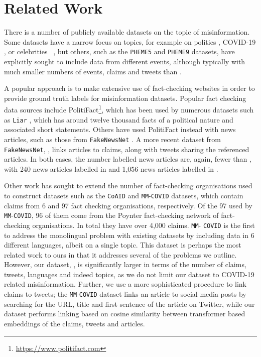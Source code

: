 \documentclass[sigconf,natbib=true,anonymous=false,nonacm]{acmart}
\begin{document}
\section{Related Work}
\label{sec:relatedwork}
There is a number of publicly available datasets on the topic of
misinformation. Some datasets have a narrow focus on topics, for example on
politics \citep{wang2017liar}, COVID-19 \citep{li2020mmcovid, cui2020coaid}, or
celebrities ~\citep{perez2018automatic}, but others, such as the
\texttt{PHEME5} \citep{zubiaga2017exploiting} and \texttt{PHEME9}
\citep{kochkina2018allinone} datasets, have explicitly sought to include data
from different events, although typically with much smaller numbers of events,
claims and tweets than \datasetname.



A popular approach is to make extensive use of fact-checking websites in order
to provide ground truth labels for misinformation datasets. Popular fact
checking data sources include
PolitiFact\footnote{\url{https://www.politifact.com}}, which has been used by
numerous datasets such as \texttt{Liar} \citep{wang2017liar}, which has around
twelve thousand facts of a political nature and associated short statements.
Others have used PolitiFact instead with news articles, such as those from
\texttt{FakeNewsNet} \citep{shu2017exploiting, shu2020fakenewsnet}. A more
recent dataset from \texttt{FakeNewsNet}, \citep{shu2020fakenewsnet}, links
articles to claims, along with tweets sharing the referenced articles. In both
cases, the number labelled news articles are, again, fewer than \datasetname,
with 240 news articles labelled in \citep{shu2017exploiting} and 1,056 news
articles labelled in \citep{shu2020fakenewsnet}.

Other work has sought to extend the number of fact-checking organisations used
to construct datasets such as the \texttt{CoAID} \citep{cui2020coaid} and
\texttt{MM}-\texttt{COVID} \citep{li2020mmcovid} datasets, which contain claims
from 6 and 97 fact checking organisations, respectively. Of the 97 used by
\texttt{MM}-\texttt{COVID}, 96 of them come from the Poynter fact-checking
network of fact-checking organisations. In total they have over 4,000 claims.
\texttt{MM}-\newline
\texttt{COVID} is the first to address the monolingual problem with
existing datasets by including data in 6 different languages, albeit on a
single topic. This dataset is perhaps the most related work to ours in that it
addresses several of the problems we outline. However, our dataset,
\datasetname, is significantly larger in terms of the number of claims, tweets,
languages and indeed topics, as we do not limit our dataset to COVID-19 related
misinformation. Further, we use a more sophisticated procedure to link claims
to tweets; the \texttt{MM}-\texttt{COVID} dataset links an article to social
media posts by searching for the URL, title and first sentence of the article
on Twitter, while our dataset performs linking based on cosine similarity
between transformer based embeddings of the claims, tweets and articles.
\end{document}
